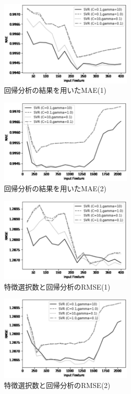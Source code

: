 \documentclass[12pt,a4paper,twocolumn,twoside]{jsik}
\begin{document}
\begin{figure}[htb]
  \begin{center}
    \includegraphics[width=6.5cm]{./eps/mae_svr_25-400.eps}
    \caption{回帰分析の結果を用いたMAE(1)}
    \label{fig:graf_mae25-400}
  \end{center}
\end{figure}
%
\begin{figure}[htb]
  \begin{center}
    \includegraphics[width=6.5cm]{./eps/mae_svr_100-2000.eps}
    \caption{回帰分析の結果を用いたMAE(2)}
    \label{fig:graf_mae100-2000}
  \end{center}
\end{figure}
%
\begin{figure}[htb]
  \begin{center}
    \includegraphics[width=6.5cm]{./eps/rmse_svr_25-400.eps}
    \caption{特徴選択数と回帰分析のRMSE(1)}
    \label{fig:graf_rmse25-400}
  \end{center}
\end{figure}

\newpage
\begin{figure}[htb]
  \begin{center}
    \includegraphics[width=6.5cm]{./eps/rmse_svr_100-2000.eps}
    \caption{特徴選択数と回帰分析のRMSE(2)}
    \label{fig:graf_rmse100-2000}
  \end{center}
\end{figure}
\end{document}

